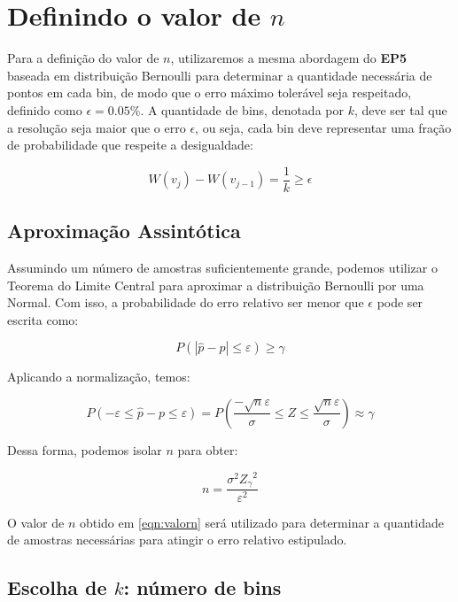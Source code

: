 \documentclass[12pt, a4paper]{article}
\begin{document}
\section{Definindo o valor de \( n \)}

Para a definição do valor de \( n \), utilizaremos a mesma abordagem do \textbf{EP5} baseada em distribuição Bernoulli para determinar a quantidade necessária de pontos em cada bin, de modo que o erro máximo tolerável seja respeitado, definido como \( \epsilon = 0.05\% \). A quantidade de bins, denotada por \( k \), deve ser tal que a resolução seja maior que o erro \( \epsilon \), ou seja, cada bin deve representar uma fração de probabilidade que respeite a desigualdade:

\begin{equation}
    W(v_j) - W(v_{j-1}) = \frac{1}{k} \geq \epsilon
    \label{eqn:valork}
\end{equation}

\subsection{Aproximação Assintótica}

Assumindo um número de amostras suficientemente grande, podemos utilizar o Teorema do Limite Central para aproximar a distribuição Bernoulli por uma Normal. Com isso, a probabilidade do erro relativo ser menor que \( \epsilon \) pode ser escrita como:

\[
P(|\hat{p} - p|\leq \varepsilon)\geq \gamma 
\]

Aplicando a normalização, temos:

\[
P(-\varepsilon \leq \hat{p} - p \leq \varepsilon) = P\left( \frac{-\sqrt{n}\varepsilon}{\sigma} \leq Z \leq \frac{\sqrt{n}\varepsilon}{\sigma}\right) \approx \gamma
\]

Dessa forma, podemos isolar \( n \) para obter:

\begin{equation}
    n = \frac {\sigma^2 {Z_\gamma}^2} {\varepsilon^2}
    \label{eqn:valorn}
\end{equation}

O valor de \( n \) obtido em \ref{eqn:valorn} será utilizado para determinar a quantidade de amostras necessárias para atingir o erro relativo estipulado.


\subsection{Escolha de \( k \): número de bins}
\end{document}
